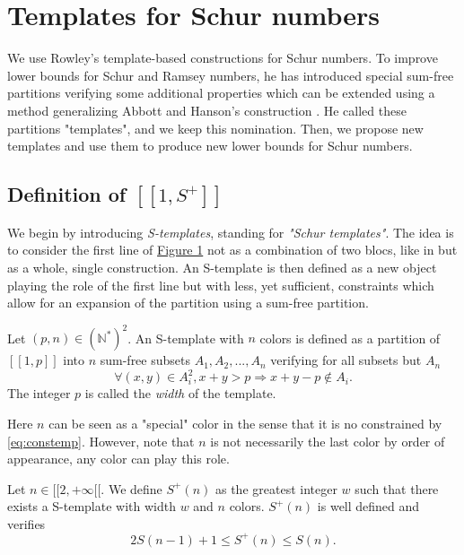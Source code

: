 \section{Templates for Schur numbers}
\label{Schur}

We use Rowley's template-based constructions \cite{RowleyRamsey} for Schur 
numbers. To improve lower bounds for Schur and Ramsey numbers, he has introduced special sum-free 
partitions verifying some additional properties which can be extended using a method generalizing Abbott and 
Hanson's construction \cite{AbbottHanson}. He called these partitions "templates", and we keep this nomination. 
Then, we propose new templates and use them to produce new lower bounds for Schur numbers.

\subsection{Definition of \( [\![ 1, S^+ ]\!] \)}

We begin by introducing \textit{S-templates}, standing for \textit{"Schur templates"}. The idea is to consider the first line
of \hyperref[figure:1]{Figure 1} not as a combination of two blocs, like in \cite{AbbottHanson} but as a whole, single construction. 
An S-template is then defined as a new object playing the role of the first line but with less, yet sufficient, 
constraints which allow for an expansion of the partition using a sum-free partition.

\begin{definition}
Let \((p,n) \in (\mathbb{N}^*)^2\). An S-template with \(n\) colors is defined as a partition of 
\([\![1,p]\!]\) into \(n\) sum-free subsets \(A_1, A_2, ..., A_n\) verifying for all subsets but \(A_n\)
\begin{equation}
\label{eq:constemp}
\forall (x,y) \in A_i^2, x+y > p
\Longrightarrow x+y-p \notin A_i.
\end{equation}
The integer \(p\) is called the \textit{width} of the template.
\end{definition}

Here \(n\) can be seen as a "special" color in the sense that it is no constrained by \ref{eq:constemp}.
However, note that \(n\) is not necessarily the last color by order of appearance, any color can play this role.


\begin{proposition}
	Let \(n \in [\![2, +\infty[\![\). We define \(S^+(n)\) as the greatest integer \(w\) such that there exists a S-template with 
	width \(w\) and \(n\) colors. 
	\(S^+(n)\) is well defined and verifies
	\[
	2S(n-1)+1 \leqslant S^+(n) \leqslant S(n).
	\]
\end{proposition}

